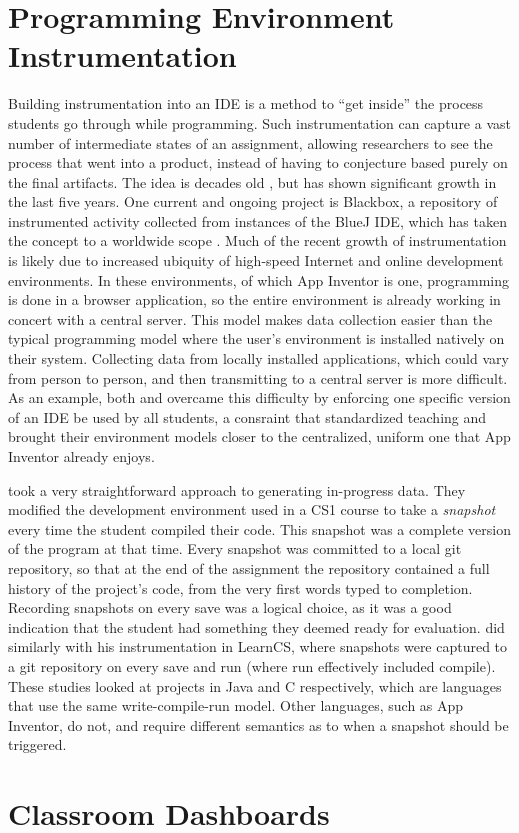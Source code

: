 \section{Programming Environment Instrumentation}
Building instrumentation into an IDE is a method to ``get inside'' the process students go through while programming. Such instrumentation can capture a vast number of intermediate states of an assignment, allowing researchers to see the process that went into a product, instead of having to conjecture based purely on the final artifacts. The idea is decades old \citep{spohrer1985goal}, but has shown significant growth in the last five years. One current and ongoing project is Blackbox, a repository of instrumented activity collected from instances of the BlueJ IDE, which has taken the concept to a worldwide scope \citep{brown2014blackbox}. Much of the recent growth of instrumentation is likely due to increased ubiquity of high-speed Internet and online development environments. In these environments, of which App Inventor is one, programming is done in a browser application, so the entire environment is already working in concert with a central server. This model makes data collection easier than the typical programming model where the user's environment is installed natively on their system. Collecting data from locally installed applications, which could vary from person to person, and then transmitting to a central server is more difficult. As an example, both \citet{piech-2012} and \citet{brown2014blackbox} overcame this difficulty by enforcing one specific version of an IDE be used by all students, a consraint that standardized teaching and brought their environment models closer to the centralized, uniform one that App Inventor already enjoys.

\citet{piech-2012} took a very straightforward approach to generating in-progress data. They modified the development environment used in a CS1 course to take a \emph{snapshot} every time the student compiled their code. This snapshot was a complete version of the program at that time. Every snapshot was committed to a local git repository, so that at the end of the assignment the repository contained a full history of the project's code, from the very first words typed to completion. Recording snapshots on every save was a logical choice, as it was a good indication that the student had something they deemed ready for evaluation. \citet{lipman-phd} did similarly with his instrumentation in LearnCS, where snapshots were captured to a git repository on every save and run (where run effectively included compile). These studies looked at projects in Java and C respectively, which are languages that use the same write-compile-run model. Other languages, such as App Inventor, do not, and require different semantics as to when a snapshot should be triggered.


\section{Classroom Dashboards}
\label{sec:teacher-dashboards}



